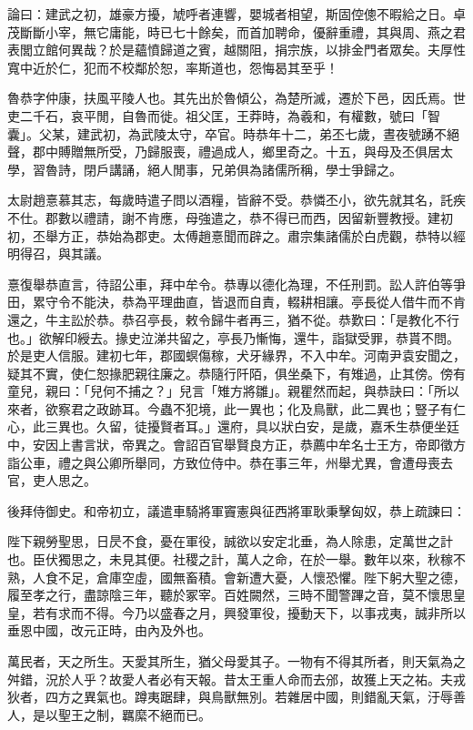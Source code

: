 \begin{pinyinscope}
論曰：建武之初，雄豪方擾，虓呼者連響，嬰城者相望，斯固倥傯不暇給之日。卓茂斷斷小宰，無它庸能，時已七十餘矣，而首加聘命，優辭重禮，其與周、燕之君表閭立館何異哉？於是蘊憤歸道之賓，越關阻，捐宗族，以排金門者眾矣。夫厚性寬中近於仁，犯而不校鄰於恕，率斯道也，怨悔曷其至乎！

魯恭字仲康，扶風平陵人也。其先出於魯傾公，為楚所滅，遷於下邑，因氏焉。世吏二千石，哀平閒，自魯而徙。祖父匡，王莽時，為羲和，有權數，號曰「智囊」。父某，建武初，為武陵太守，卒官。時恭年十二，弟丕七歲，晝夜號踴不絕聲，郡中賻贈無所受，乃歸服喪，禮過成人，鄉里奇之。十五，與母及丕俱居太學，習魯詩，閉戶講誦，絕人閒事，兄弟俱為諸儒所稱，學士爭歸之。

太尉趙憙慕其志，每歲時遣子問以酒糧，皆辭不受。恭憐丕小，欲先就其名，託疾不仕。郡數以禮請，謝不肯應，母強遣之，恭不得已而西，因留新豐教授。建初初，丕舉方正，恭始為郡吏。太傅趙憙聞而辟之。肅宗集諸儒於白虎觀，恭特以經明得召，與其議。

憙復舉恭直言，待詔公車，拜中牟令。恭專以德化為理，不任刑罰。訟人許伯等爭田，累守令不能決，恭為平理曲直，皆退而自責，輟耕相讓。亭長從人借牛而不肯還之，牛主訟於恭。恭召亭長，敕令歸牛者再三，猶不從。恭歎曰：「是教化不行也。」欲解印綬去。掾史泣涕共留之，亭長乃慚悔，還牛，詣獄受罪，恭貰不問。於是吏人信服。建初七年，郡國螟傷稼，犬牙緣界，不入中牟。河南尹袁安聞之，疑其不實，使仁恕掾肥親往廉之。恭隨行阡陌，俱坐桑下，有雉過，止其傍。傍有童兒，親曰：「兒何不捕之？」兒言「雉方將雛」。親瞿然而起，與恭訣曰：「所以來者，欲察君之政跡耳。今蟲不犯境，此一異也；化及鳥獸，此二異也；豎子有仁心，此三異也。久留，徒擾賢者耳。」還府，具以狀白安，是歲，嘉禾生恭便坐廷中，安因上書言狀，帝異之。會詔百官舉賢良方正，恭薦中牟名士王方，帝即徵方詣公車，禮之與公卿所舉同，方致位侍中。恭在事三年，州舉尤異，會遭母喪去官，吏人思之。

後拜侍御史。和帝初立，議遣車騎將軍竇憲與征西將軍耿秉擊匈奴，恭上疏諫曰：

陛下親勞聖思，日昃不食，憂在軍役，誠欲以安定北垂，為人除患，定萬世之計也。臣伏獨思之，未見其便。社稷之計，萬人之命，在於一舉。數年以來，秋稼不熟，人食不足，倉庫空虛，國無畜積。會新遭大憂，人懷恐懼。陛下躬大聖之德，履至孝之行，盡諒陰三年，聽於冢宰。百姓闕然，三時不聞警蹕之音，莫不懷思皇皇，若有求而不得。今乃以盛春之月，興發軍役，擾動天下，以事戎夷，誠非所以垂恩中國，改元正時，由內及外也。

萬民者，天之所生。天愛其所生，猶父母愛其子。一物有不得其所者，則天氣為之舛錯，況於人乎？故愛人者必有天報。昔太王重人命而去邠，故獲上天之祐。夫戎狄者，四方之異氣也。蹲夷踞肆，與鳥獸無別。若雜居中國，則錯亂天氣，汙辱善人，是以聖王之制，羈縻不絕而已。


\end{pinyinscope}
